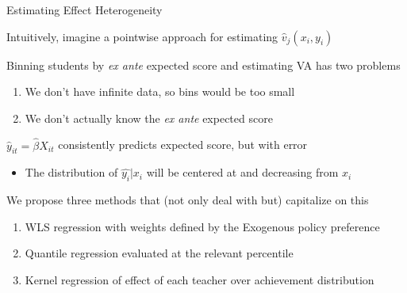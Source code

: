\documentclass[t,aspectratio=169,11pt]{beamer}
\newenvironment{wideitemize}{\itemize\addtolength{\itemsep}{14pt}}{\enditemize}
\begin{document}
\begin{frame}{Estimating Effect Heterogeneity}

\begin{wideitemize}
    \item Intuitively, imagine a pointwise approach for estimating $\hat{v}_j(x_i,y_i)$
    
    \item Binning students by \textit{ex ante} expected score and estimating VA has two problems
    \begin{enumerate}
        \item We don't have infinite data, so bins would be too small
        \item We don't actually know the \textit{ex ante} expected score
    \end{enumerate}

    \item $\hat{y}_{it} = \hat{\beta} X_{it} $ consistently predicts expected score, but with error
    \begin{itemize}
        \item The distribution of $\hat{y_i}|x_i$ will be centered at and decreasing from $x_i$
    \end{itemize}


    \item We propose three methods that (not only deal with but) capitalize on this
    \begin{enumerate}
        \item WLS regression with weights defined by the Exogenous policy preference
        \item Quantile regression evaluated at the relevant percentile
        \item Kernel regression of effect of each teacher over achievement distribution
    \end{enumerate}

\end{wideitemize}

\end{frame}


\end{document}
